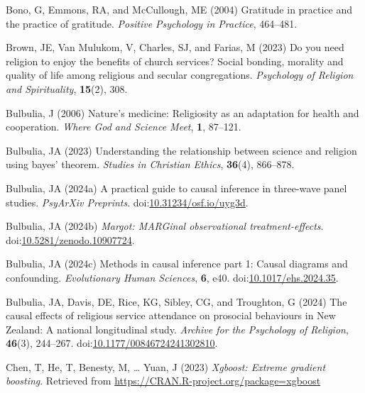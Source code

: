 \documentclass[
  single column]{article}
\newlength{\cslhangindent}
\newenvironment{CSLReferences}[2] %
 {\begin{list}{}{%
  \setlength{\itemindent}{0pt}
  \setlength{\leftmargin}{0pt}
  \setlength{\parsep}{0pt}
  \ifodd #1
   \setlength{\leftmargin}{\cslhangindent}
   \setlength{\itemindent}{-1\cslhangindent}
  \fi
  \setlength{\itemsep}{#2\baselineskip}}}
 {\end{list}}
\begin{document}
\label{refs}
\begin{CSLReferences}{1}{0}
Bono, G, Emmons, RA, and McCullough, ME (2004) Gratitude in practice and
the practice of gratitude. \emph{Positive Psychology in Practice},
464--481.

Brown, JE, Van Mulukom, V, Charles, SJ, and Farias, M (2023) Do you need
religion to enjoy the benefits of church services? Social bonding,
morality and quality of life among religious and secular congregations.
\emph{Psychology of Religion and Spirituality}, \textbf{15}(2), 308.

Bulbulia, J (2006) Nature's medicine: Religiosity as an adaptation for
health and cooperation. \emph{Where God and Science Meet}, \textbf{1},
87--121.

Bulbulia, JA (2023) Understanding the relationship between science and
religion using bayes' theorem. \emph{Studies in Christian Ethics},
\textbf{36}(4), 866--878.

Bulbulia, JA (2024a) A practical guide to causal inference in three-wave
panel studies. \emph{PsyArXiv Preprints}.
doi:\href{https://doi.org/10.31234/osf.io/uyg3d}{10.31234/osf.io/uyg3d}.

Bulbulia, JA (2024b) \emph{Margot: MARGinal observational
treatment-effects}.
doi:\href{https://doi.org/10.5281/zenodo.10907724}{10.5281/zenodo.10907724}.

Bulbulia, JA (2024c) Methods in causal inference part 1: Causal diagrams
and confounding. \emph{Evolutionary Human Sciences}, \textbf{6}, e40.
doi:\href{https://doi.org/10.1017/ehs.2024.35}{10.1017/ehs.2024.35}.

Bulbulia, JA, Davis, DE, Rice, KG, Sibley, CG, and Troughton, G (2024)
The causal effects of religious service attendance on prosocial
behaviours in {New Zealand}: {A} national longitudinal study.
\emph{Archive for the Psychology of Religion}, \textbf{46}(3), 244--267.
doi:\href{https://doi.org/10.1177/00846724241302810}{10.1177/00846724241302810}.

Chen, T, He, T, Benesty, M, \ldots{} Yuan, J (2023) \emph{Xgboost:
Extreme gradient boosting}. Retrieved from
\url{https://CRAN.R-project.org/package=xgboost}


\end{CSLReferences}
\end{document}
